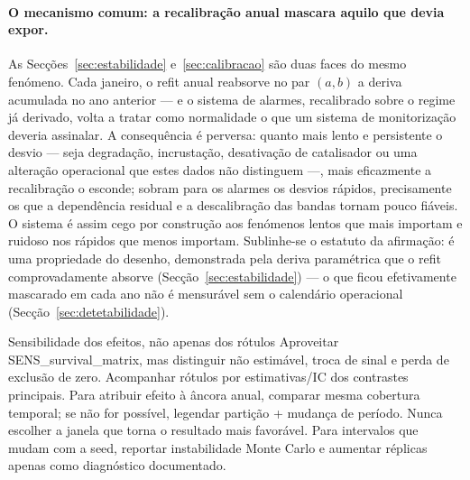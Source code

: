 \paragraph{O mecanismo comum: a recalibração anual mascara aquilo que devia
expor.} As Secções~\ref{sec:estabilidade} e~\ref{sec:calibracao} são
duas faces do mesmo fenómeno. Cada janeiro, o refit anual reabsorve no par
$(a,b)$ a deriva acumulada no ano anterior --- e o sistema de alarmes,
recalibrado sobre o regime já derivado, volta a tratar como normalidade o
que um sistema de monitorização deveria assinalar. A consequência é
perversa: quanto mais lento e persistente o desvio --- seja degradação,
incrustação, desativação de catalisador ou uma alteração operacional que
estes dados não distinguem ---, mais eficazmente a recalibração o esconde; sobram para os
alarmes os desvios rápidos, precisamente os que a dependência residual e a
descalibração das bandas tornam pouco fiáveis. O sistema é assim cego por
construção aos fenómenos lentos que mais importam e ruidoso nos rápidos que
menos importam. Sublinhe-se o estatuto da afirmação: é uma propriedade do
desenho, demonstrada pela deriva paramétrica que o refit comprovadamente
absorve (Secção~\ref{sec:estabilidade}) --- o que ficou efetivamente
mascarado em cada ano não é mensurável sem o calendário operacional
(Secção~\ref{sec:detetabilidade}).

{Sensibilidade dos efeitos, não apenas dos rótulos}
{Aproveitar SENS\_survival\_matrix, mas distinguir não estimável, troca de
sinal e perda de exclusão de zero. Acompanhar rótulos por estimativas/IC
dos contrastes principais. Para atribuir efeito à âncora anual, comparar
mesma cobertura temporal; se não for possível, legendar partição +
mudança de período. Nunca escolher a janela que torna o resultado mais
favorável. Para intervalos que mudam com a seed, reportar instabilidade
Monte Carlo e aumentar réplicas apenas como diagnóstico documentado.}%
